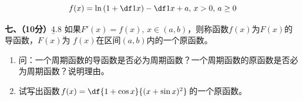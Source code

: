 \begin{frame}
	\linespread{1.2}
	\begin{center}
		$$f(x)=\ln\left(1+\df 1x\right)-\df 1{x+a},\,x>0,\, a\geq 0$$
	\end{center}
\end{frame}

\begin{frame}
	\linespread{1.4}
	\begin{exampleblock}{{\bf 七、（10分）}\hfill\hfill{\b 4.8}}
		如果$F'(x)=f(x),\,x\in(a,b)$，则称函数$f(x)$为$F(x)$的导函数，$F(x)$为
		$f(x)$在区间$(a,b)$内的一个原函数。\pause
		\begin{enumerate}
		  \item 问：一个周期函数的导函数是否必为周期函数？一个周期函数的原函数是否必为周期函数？说明理由。\pause
		  \item 试写出函数$f(x)=\df{1+\cos x}{(x+\sin x)^2}$的一个原函数。
		\end{enumerate}
	\end{exampleblock}
\end{frame}

\begin{frame}
	\linespread{1.2}
	\begin{center}
	\end{center}
\end{frame}